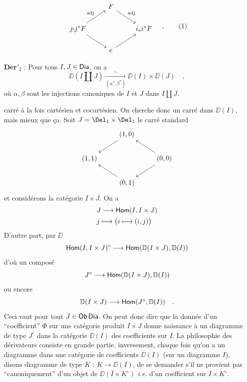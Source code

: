 \[
\begin{tikzcd}
& F \arrow[dr, "\mathrm{adj}"] & \\
j_!j^*F \arrow[ur, "\mathrm{adj}"] \arrow[dr] & & i_*i^*F \\
& e \arrow[ur] &
\end{tikzcd}
\quad ,
\tag*{(1)}
\]

\textbf{Der}$'_2$ : Pour tous $I, J \in \mathsf{Dia}$, on a
\[ \DD(I \amalg J) \xrightarrow[(\alpha^*, \beta^*)]{\sim} \DD(I) \times \DD(J) \quad , \]
où $\alpha, \beta$ sont les injections canoniques de $I$ et $J$ dans $I \amalg J$.


carré à la fois cartésien et cocartésien. On cherche donc un carré dans $\DD(I)$, mais mieux que ça. Soit $J = \Del_1 \times \Del_1$ le carré standard
\[
\begin{tikzcd}
& (1,0) \arrow[dl] & \\
(1,1) & & (0,0) \arrow[ul] \arrow[dl] \\
& (0,1) \arrow[ul] &
\end{tikzcd}
\]
et considérons la catégorie $I \times J$. On a
\[
\begin{aligned}
& J \longrightarrow \mathsf{Hom}(I, I \times J) \\
& j \longmapsto \bigl(i \longmapsto (i,j)\bigr)
\end{aligned}
\]
D'autre part, par $\DD$
\[ \mathsf{Hom}(I, I \times J)^{\circ} \longrightarrow \mathsf{Hom}(\mathbb{D}(I \times J), \mathbb{D}(I)) \]
d'où un composé
\[ J^{\circ} \longrightarrow \mathsf{Hom}(\mathbb{D}(I \times J), \mathbb{D}(I)) \]
ou encore
\[ \mathbb{D}(I \times J) \longrightarrow \mathsf{Hom}(J^{\circ}, \mathbb{D}(I)) \quad . \]
Ceci vaut pour tout $J \in \mathsf{Ob} \, \mathsf{Dia}$. On peut donc dire que la donnée d'un “coefficient” $\Phi$ sur une catégorie produit $I \times J$ donne naissance à un diagramme de type $J^{\circ}$ dans la catégorie $\DD(I)$ des coefficients sur $I$. La philosophie
des dérivateurs consiste en grande partie, inversement, chaque fois qu'on a un diagramme dans une catégorie de coefficients $\DD(I)$ (sur un diagramme $I$), disons diagramme de type $K$ : $K \to \DD(I)$, de se demander s'il ne provient pas “canoniquement” d'un objet de $\DD(I \times K^{\circ})$ \textit{i.e.} d'un coefficient sur $I \times K^{\circ}$.

